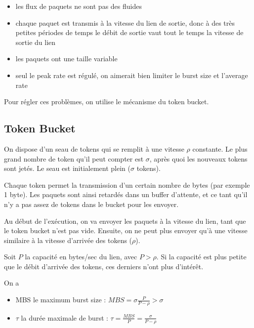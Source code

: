 			
			\begin{itemize}
				\item les flux de paquets ne sont pas des fluides
				\item chaque paquet est transmis à la vitesse du lien de sortie, donc à des très petites périodes de temps le débit de sortie vaut tout le temps la vitesse de sortie du lien
				\item les paquets ont une taille variable
				\item seul le peak rate est régulé, on aimerait bien limiter le burst size et l'average rate
			\end{itemize}
			
			Pour régler ces problèmes, on utilise le mécanisme du token bucket.
			
			\subsection{Token Bucket}
			
			On dispose d'un seau de tokens qui se remplit à une vitesse $\rho$ constante. Le plus grand nombre de token qu'il peut compter est $\sigma$, après quoi les nouveaux tokens sont jetés. Le seau est initialement plein ($\sigma$ tokens).
			
			
			Chaque token permet la transmission d'un certain nombre de bytes (par exemple 1 byte). Les paquets sont ainsi retardés dans un buffer d'attente, et ce tant qu'il n'y a pas assez de tokens dans le bucket pour les envoyer.
		
			
			Au début de l'exécution, on va envoyer les paquets à la vitesse du lien, tant que le token bucket n'est pas vide. Ensuite, on ne peut plus envoyer qu'à une vitesse similaire à la vitesse d'arrivée des tokens ($\rho$).
			
			Soit $P$ la capacité en bytes/sec du lien, avec $P > \rho$. Si la capacité est plus petite que le débit d'arrivée des tokens, ces derniers n'ont plus d'intérêt.
			
			
			On a 
			
			\begin{itemize}
				\item MBS le maximum burst size : $MBS = \sigma \frac{P}{P - \rho} > \sigma$
				\item $\tau$ la durée maximale de burst : $\tau = \frac{MBS}{P} = \frac{\sigma}{P - \rho}$
			\end{itemize}
			
